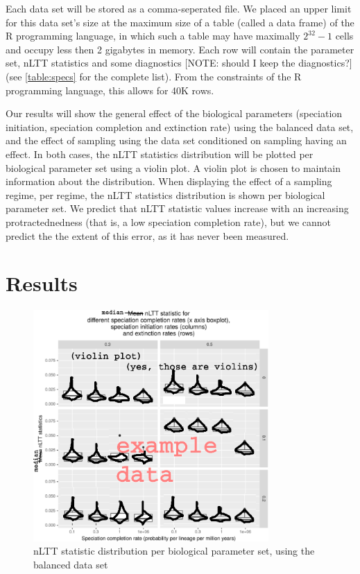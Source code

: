 \documentclass{article}
\begin{document}
Each data set will be stored as a comma-seperated file. We placed 
an upper limit for this data set's size at the maximum size of a table (called 
a data frame) of the R programming language, in which such a table may 
have maximally $2^{32}-1$ cells and occupy less then 2 gigabytes in memory.
Each row will contain the parameter set, nLTT statistics and some 
diagnostics [NOTE: should I keep the diagnostics?] (see \ref{table:specs} for the 
complete list). From the constraints of the R programming language, this allows for 40K rows. 

Our results will show the general effect of the biological parameters (speciation initiation, 
speciation completion and extinction rate) using the balanced data set,
and the effect of sampling using the data set conditioned on sampling having an effect.
In both cases, the nLTT statistics distribution will be plotted per
biological parameter set using a violin plot. A violin plot is chosen to
maintain information about the distribution. When displaying the effect of a 
sampling regime, per regime, the nLTT statistics distribution is shown per
biological parameter set.
We predict that nLTT statistic values increase 
with an increasing protractednedness (that is, a low speciation completion rate),
but we cannot predict the the extent of this error, as it has never been 
measured.

\section{Results}

\begin{figure}[!htbp]
  \includegraphics[width=0.8\textwidth]{fig_nltt_stats_per_setup.png}
  \caption{
    nLTT statistic distribution per biological parameter set, using the
    balanced data set
  }
\end{figure}
\end{document}
